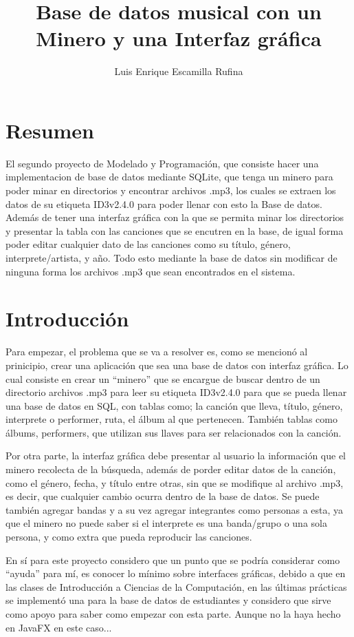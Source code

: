 \documentclass[12pt,letterpaper]{article}
\title{Base de datos musical con un Minero y una Interfaz gráfica}
\author{Luis Enrique Escamilla Rufina}
\begin{document}
\maketitle
\thispagestyle{fancy} 

\section{Resumen}
El segundo proyecto de Modelado y Programación, que consiste hacer una implementacion de base de datos mediante SQLite, que tenga un minero para poder minar en directorios y encontrar archivos .mp3, los cuales se extraen los datos de su etiqueta ID3v2.4.0 para poder llenar con esto la Base de datos. Además de tener una interfaz gráfica con la que se permita minar los directorios y presentar la tabla con las canciones que se encutren en la base, de igual forma poder editar cualquier dato de las canciones como su título, género, interprete/artista, y año. Todo esto mediante la base de datos sin modificar de ninguna forma los archivos .mp3 que sean encontrados en el sistema.

\section{Introducción}
Para empezar, el problema que se va a resolver es, como se mencionó al prinicipio, crear una aplicación que sea una base de datos con interfaz gráfica. Lo cual consiste en crear un ``minero'' que se encargue de buscar dentro de un directorio archivos .mp3 para leer su etiqueta ID3v2.4.0 para que se pueda llenar una base de datos en SQL, con tablas como; la canción que lleva, título, género, interprete o performer, ruta, el álbum al que pertenecen. También tablas como álbums, performers, que utilizan sus llaves para ser relacionados con la canción. 

Por otra parte, la interfaz gráfica debe presentar al usuario la información que el minero recolecta de la búsqueda, además de porder editar datos de la canción, como el género, fecha, y título entre otras, sin que se modifique al archivo .mp3, es decir, que cualquier cambio ocurra dentro de la base de datos. Se puede también agregar bandas y a su vez agregar integrantes como personas a esta, ya que el minero no puede saber si el interprete es una banda/grupo o una sola persona, y como extra que pueda reproducir las canciones.

En sí para este proyecto considero que un punto que se podría considerar como ``ayuda'' para mí, es conocer lo mínimo sobre interfaces gráficas, debido a que en las clases de Introducción a Ciencias de la Computación, en las últimas prácticas se implementó una para la base de datos de estudiantes y considero que sirve como apoyo para saber como empezar con esta parte. Aunque no la haya hecho en JavaFX en este caso...
\end{document}
